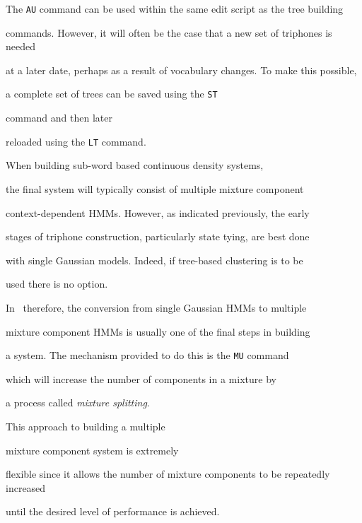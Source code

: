 The \texttt{AU} command can be used within the same edit script as the tree building


commands.  However, it will often be the case that a new set of triphones is needed


at a later date, perhaps as a result of vocabulary changes.  To make this possible,


a complete set of trees can be saved using the \texttt{ST} 


command and then later


reloaded using the \texttt{LT} command.












When building sub-word based continuous density systems, 


the final system will typically consist of multiple mixture component


context-dependent HMMs.  However, as indicated previously, the early


stages of triphone construction, particularly state tying, are best done


with single Gaussian models.  Indeed, if tree-based clustering is to be


used there is no option.





In \HTK\ therefore, the conversion from single Gaussian HMMs to multiple


mixture component HMMs is usually one of the final steps in building


a system.  The mechanism provided to do this is the  \texttt{MU} command


which will increase the number of components in a mixture by 


a process called \textit{mixture splitting}.


This approach to building a multiple


mixture component system is extremely


flexible since it allows the number of mixture components to be repeatedly increased


until the desired level of performance is achieved.





